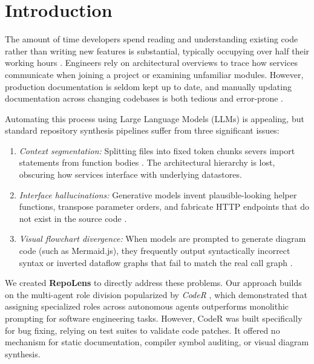 \documentclass[conference]{IEEEtran}
\begin{document}
\section{Introduction}
The amount of time developers spend reading and understanding existing code rather than writing new features is substantial, typically occupying over half their working hours \cite{xia2017comprehension}. Engineers rely on architectural overviews to trace how services communicate when joining a project or examining unfamiliar modules. However, production documentation is seldom kept up to date, and manually updating documentation across changing codebases is both tedious and error-prone \cite{devgpt2024,bavota2014impact}.

Automating this process using Large Language Models (LLMs) is appealing, but standard repository synthesis pipelines suffer from three significant issues:
\begin{enumerate}
    \item \textit{Context segmentation:} Splitting files into fixed token chunks severs import statements from function bodies \cite{repocoder2023,lewis2020rag}. The architectural hierarchy is lost, obscuring how services interface with underlying datastores.
    \item \textit{Interface hallucinations:} Generative models invent plausible-looking helper functions, transpose parameter orders, and fabricate HTTP endpoints that do not exist in the source code \cite{huang2023agentcoder,ji2023surveyhallucination}.
    \item \textit{Visual flowchart divergence:} When models are prompted to generate diagram code (such as Mermaid.js), they frequently output syntactically incorrect syntax or inverted dataflow graphs that fail to match the real call graph \cite{graphcoder2025}.
\end{enumerate}

We created \textbf{RepoLens} to directly address these problems. Our approach builds on the multi-agent role division popularized by \textit{CodeR} \cite{coder2025}, which demonstrated that assigning specialized roles across autonomous agents outperforms monolithic prompting for software engineering tasks. However, CodeR was built specifically for bug fixing, relying on test suites to validate code patches. It offered no mechanism for static documentation, compiler symbol auditing, or visual diagram synthesis.
\end{document}
